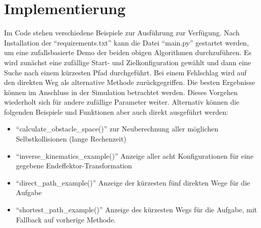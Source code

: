 \section{Implementierung}

Im Code stehen verschiedene Beispiele zur Ausführung zur Verfügung.
Nach Installation der \enquote{requirements.txt} kann die Datei \enquote{main.py} gestartet werden, um eine zufallsbasierte Demo der beiden obigen Algorithmen durchzuführen.
Es wird zunächst eine zufällige Start- und Zielkonfiguration gewählt und dann eine Suche nach einem kürzesten Pfad durchgeführt.
Bei einem Fehlschlag wird auf den direkten Weg als alternative Methode zurückgegriffen.
Die besten Ergebnisse können im Anschluss in der Simulation betrachtet werden.
Dieses Vorgehen wiederholt sich für andere zufällige Parameter weiter.
Alternativ können die folgenden Beispiele und Funktionen aber auch direkt ausgeführt werden:

\begin{itemize}
    \item \enquote{calculate\_obstacle\_space()} zur Neuberechnung aller möglichen Selbstkollisionen (lange Rechenzeit)
    \item \enquote{inverse\_kinematics\_example()} Anzeige aller acht Konfigurationen für eine gegebene Endeffektor-Transformation
    \item \enquote{direct\_path\_example()} Anzeige der kürzesten fünf direkten Wege für die Aufgabe
    \item \enquote{shortest\_path\_example()} Anzeige des kürzesten Wegs für die Aufgabe, mit Fallback auf vorherige Methode.
\end{itemize}

%
%

